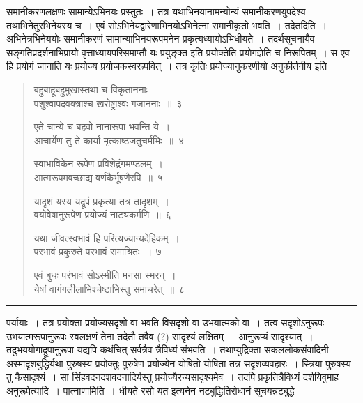 \documentclass[11pt, openany]{book}
\begin{document}
समानीकरणलक्षणः सामान्येऽभिनयः प्रस्तुतः~। तत्र यथाभिनयानामन्योन्यं समानीकरणयुपदेश्य तथाभिनेतुरभिनेयस्य च~। एवं सोऽभिनेयद्वारेणाभिनयोऽभिनेत्ना समानीकृतो भवति~। तदेतदिति~। अभिनेत्रभिनेययोः समानीकरणं सामान्याभिनयरूपमनेन प्रकृत्यध्यायोऽभिधीयते~। तदर्थसूचनायैव सङ्गतिप्रदर्शनाभिप्रायो वृत्ताध्यायपरिसमाप्तौ यः प्रयुङ्क्त इति प्रयोक्तेति प्रयोगज्ञेति च निरूपितम्~। स एव हि प्रयोगं जानाति यः प्रयोज्य प्रयोजकस्वरूपवित्~। तत्र कृतिः प्रयोज्यानुकरणीयो अनुकीर्तनीय इति

\newpage
{}

\begin{quote}
{\na बहुबाहूबहुमुखास्तथा च विकृताननाः~।\\
पशुश्वापदवक्त्राश्च खरोष्ट्राश्वः गजाननाः~॥~३

एते चान्ये च बहवो नानारूपा भवन्ति ये~।\\
आचार्येण तु ते कार्या मृत्काष्ठजतुचर्मभिः~॥~४ 

स्वाभाविकेन रूपेण प्रविशेद्रंगमण्डलम्~।\\
आत्मरूपमवच्छाद्य वर्णकैर्भूषणैरपि~॥~५

यादृशं यस्य यद्रूपं प्रकृत्या तत्र तादृशम्~।\\
वयोवेषानुरूपेण प्रयोज्यं नाट्यकर्मणि~॥~६ 

यथा जीवत्स्वभावं हि परित्यज्यान्यदेहिकम्~।\\
परभावं प्रकुरुते परभावं समाश्रितः~॥~७ 

एवं बुधः परंभावं सोऽस्मीति मनसा स्मरन्~।\\
येषां वागंगलीलाभिश्चेष्टाभिस्तु समाचरेत्~॥~८}
\end{quote}

\hrule

\vspace{2mm}
\noindent
पर्यायाः~। तत्र प्रयोक्ता प्रयोज्यसदृशो वा भवति विसदृशो वा उभयात्मको वा~। तत्व सदृशोऽनुरूपः उभयात्मरूपानुरूपः स्वलक्षणं तेना तदेतौ तवैव (?) सादृश्यं लक्षितम्~। आनुरूप्यं सादृश्यात्~। तदुभययोगाद्रूपानुरूपा यद्यपि कथंचित् सर्वत्रैव त्रैविध्यं संभवति~। तथाप्युद्रिक्ता सकललोकसंवादिनी अस्मादृशबुद्धिर्यथा पुरुषस्य प्रयोक्तुः पुरुषेण प्रयोज्येन योषितो योषिता तत्र सदृशव्यवहारः~। स्त्रिया पुरुषस्य तु कैसादृश्यं~। सा सिंहवदनदशवदनादिर्यस्तु प्रयोज्यैरन्यसादृश्यमेव~। तदपि प्रकृतित्रैविध्यं दर्शयिवुमाह अनुरूपेत्यादि~। पात्नाणामिति~। धीयते रसो यत इत्यनेन नटबुद्धितिरोधानं सूचयन्नटबुद्धे\textendash

\newpage
\end{document}
